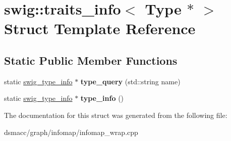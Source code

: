 \hypertarget{structswig_1_1traits__info_3_01Type_01_5_01_4}{}\section{swig\+:\+:traits\+\_\+info$<$ Type $\ast$ $>$ Struct Template Reference}
\label{structswig_1_1traits__info_3_01Type_01_5_01_4}
\subsection*{Static Public Member Functions}
\begin{DoxyCompactItemize}
\item 
\mbox{\label{structswig_1_1traits__info_3_01Type_01_5_01_4_a9ad7c24a351d4ff2ff4ce874221c1ded}} 
static \mbox{\hyperlink{structswig__type__info}{swig\+\_\+type\+\_\+info}} $\ast$ {\bfseries type\+\_\+query} (std\+::string name)
\item 
\mbox{\label{structswig_1_1traits__info_3_01Type_01_5_01_4_a61b96ed6c612d9a1daf04882a39675a3}} 
static \mbox{\hyperlink{structswig__type__info}{swig\+\_\+type\+\_\+info}} $\ast$ {\bfseries type\+\_\+info} ()
\end{DoxyCompactItemize}


The documentation for this struct was generated from the following file\+:\begin{DoxyCompactItemize}
\item 
dsmacc/graph/infomap/infomap\+\_\+wrap.\+cpp\end{DoxyCompactItemize}
